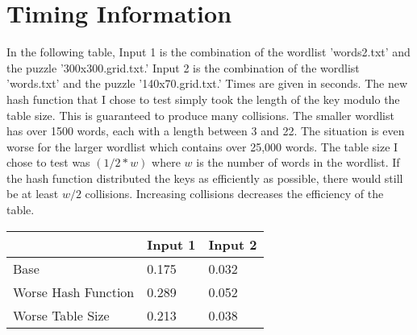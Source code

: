 \documentclass{article}
\begin{document}
\section{Timing Information}
In the following table, Input 1 is the combination of the wordlist 'words2.txt' and the puzzle '300x300.grid.txt.' Input 2 is the combination of the wordlist 'words.txt' and the puzzle '140x70.grid.txt.' Times are given in seconds. The new hash function that I chose to test simply took the length of the key modulo the table size. This is guaranteed to produce many collisions. The smaller wordlist has over 1500 words, each with a length between 3 and 22. The situation is even worse for the larger wordlist which contains over 25,000 words. The table size I chose to test was $(1/2 * w)$ where $w$ is the number of words in the wordlist. If the hash function distributed the keys as efficiently as possible, there would still be at least $w/2$ collisions. Increasing collisions decreases the efficiency of the table.
\begin{table}[h]
\centering
\begin{tabular}{l|l|l|}
\cline{2-3}
                                          & Input 1 & Input 2 \\ \hline
\multicolumn{1}{|l|}{Base}                & 0.175   & 0.032   \\ \hline
\multicolumn{1}{|l|}{Worse Hash Function} & 0.289   & 0.052   \\ \hline
\multicolumn{1}{|l|}{Worse Table Size}    & 0.213   & 0.038   \\ \hline
\end{tabular}
\end{table}
\end{document}
